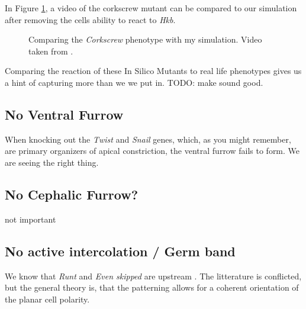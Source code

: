 In Figure \ref{fig:corkscrew-comparison}, a video of the corkscrew mutant can be compared to our simulation after removing the cells ability to react to \textit{Hkb}.

 
\begin{figure}[H]
    \centering
    \caption{Comparing the \textit{Corkscrew} phenotype with my simulation. Video taken from \cite{smits2023maintaining}.}
    \label{fig:corkscrew-comparison}
\end{figure}

Comparing the reaction of these In Silico Mutants to real life phenotypes gives us a hint of capturing more than we we put in. TODO: make sound good. 

\subsection{No Ventral Furrow}
When knocking out the \textit{Twist} and \textit{Snail} genes, which, as you might remember, are primary organizers of apical constriction, the ventral furrow fails to form. 
We are seeing the right thing.


\subsection{No Cephalic Furrow?}
not important
\subsection{No active intercolation / Germ band}
\label{sec:mutantNoGB}
We know that \textit{Runt} and \textit{Even skipped} are upstream . The litterature is conflicted, but the general theory is, that the patterning allows for a coherent orientation of the planar cell polarity. 

